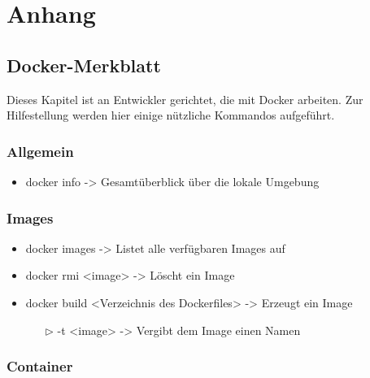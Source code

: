 \chapter{Anhang}

\section{Docker-Merkblatt}
\label{sec:docker_merkblatt}
Dieses Kapitel ist an Entwickler gerichtet, die mit Docker arbeiten.
Zur Hilfestellung werden hier einige nützliche Kommandos aufgeführt.

\subsection*{Allgemein}
\begin{itemize}
	\item docker info -> Gesamtüberblick über die lokale Umgebung
\end{itemize}

\subsection*{Images}
\begin{itemize}
	\item docker images -> Listet alle verfügbaren Images auf
	\item docker rmi <image> -> Löscht ein Image
	\item docker build <Verzeichnis des Dockerfiles> -> Erzeugt ein Image
	\begin{itemize}
		\item[$\triangleright$] -t <image> -> Vergibt dem Image einen Namen
	\end{itemize}
\end{itemize}


\subsection*{Container}

